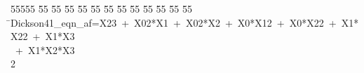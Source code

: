 %
%
\begin{tabbing}
55555 \= 55 \= 55 \= 55 \= 55 \= 55 \= 55 \= 55 \= 55 \= 55 \= 55 \= 55 \= 55 \= \>Dickson41\_eqn\_af=X23\ +\ X02*X1\ +\ X02*X2\ +\ X0*X12\ +\ X0*X22\ +\ X1*X22\ +\ X1*X3\\[0pt]
\ +\ X1*X2*X3\\[0pt]
2\>\end{tabbing}
